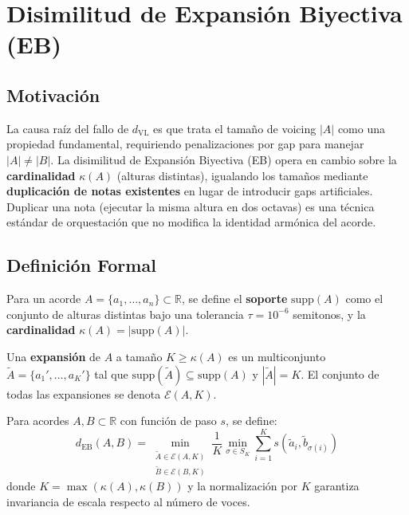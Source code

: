 \section{Disimilitud de Expansión Biyectiva (EB)}
\label{sec:metrica_EB}

\subsection{Motivación}

La causa raíz del fallo de $d_{\text{VL}}$ es que trata el tamaño de voicing $|A|$ como una propiedad fundamental, requiriendo penalizaciones por gap para manejar $|A| \neq |B|$. La disimilitud de Expansión Biyectiva (EB) opera en cambio sobre la \textbf{cardinalidad} $\kappa(A)$ (alturas distintas), igualando los tamaños mediante \textbf{duplicación de notas existentes} en lugar de introducir gaps artificiales. Duplicar una nota (ejecutar la misma altura en dos octavas) es una técnica estándar de orquestación que no modifica la identidad armónica del acorde.

\subsection{Definición Formal}

\begin{definition}
Para un acorde $A = \{a_1, \ldots, a_n\} \subset \mathbb{R}$, se define el \textbf{soporte} $\text{supp}(A)$ como el conjunto de alturas distintas bajo una tolerancia $\tau = 10^{-6}$ semitonos, y la \textbf{cardinalidad} $\kappa(A) = |\text{supp}(A)|$.
\end{definition}

\begin{definition}[Expansión]
Una \textbf{expansión} de $A$ a tamaño $K \geq \kappa(A)$ es un multiconjunto $\tilde{A} = \{a_1', \ldots, a_K'\}$ tal que $\text{supp}(\tilde{A}) \subseteq \text{supp}(A)$ y $|\tilde{A}| = K$. El conjunto de todas las expansiones se denota $\mathcal{E}(A, K)$.
\end{definition}

\begin{definition}[Disimilitud EB]
\label{def:EB}
Para acordes $A, B \subset \mathbb{R}$ con función de paso $s$, se define:
\begin{equation}
\label{eq:EB}
d_{\text{EB}}(A, B) = \min_{\substack{\tilde{A} \in \mathcal{E}(A, K) \\ \tilde{B} \in \mathcal{E}(B, K)}} \frac{1}{K} \min_{\sigma \in S_K} \sum_{i=1}^{K} s(\tilde{a}_i, \tilde{b}_{\sigma(i)})
\end{equation}
donde $K = \max(\kappa(A), \kappa(B))$ y la normalización por $K$ garantiza invariancia de escala respecto al número de voces.
\end{definition}

